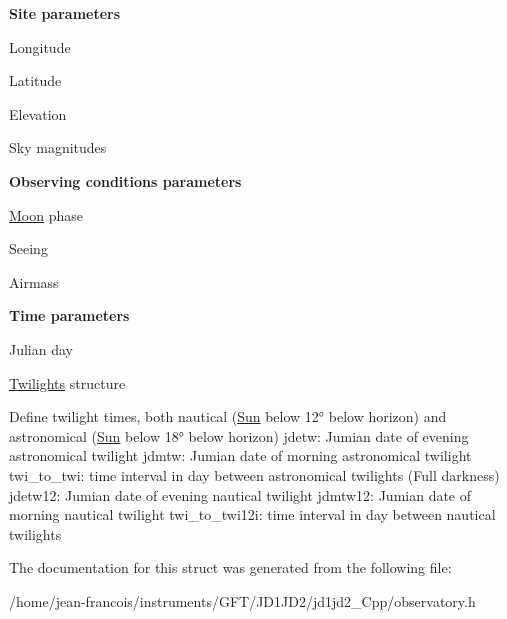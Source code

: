 {\bfseries Site parameters }\par
 Longitude \par
 Latitude \par
 Elevation \par
 Sky magnitudes \par
 {\bfseries  Observing conditions parameters} \par
 \hyperlink{class_moon}{Moon} phase \par
 Seeing \par
 Airmass \par
 {\bfseries Time parameters }\par
 Julian day \par
\hyperlink{struct_twilights}{Twilights} structure

Define twilight times, both nautical (\hyperlink{class_sun}{Sun} below 12° below horizon) and astronomical (\hyperlink{class_sun}{Sun} below 18° below horizon) jdetw\-: Jumian date of evening astronomical twilight jdmtw\-: Jumian date of morning astronomical twilight twi\-\_\-to\-\_\-twi\-: time interval in day between astronomical twilights (Full darkness) jdetw12\-: Jumian date of evening nautical twilight jdmtw12\-: Jumian date of morning nautical twilight twi\-\_\-to\-\_\-twi12i\-: time interval in day between nautical twilights 

The documentation for this struct was generated from the following file\-:\begin{DoxyCompactItemize}
\item 
/home/jean-\/francois/instruments/\-G\-F\-T/\-J\-D1\-J\-D2/jd1jd2\-\_\-\-Cpp/observatory.\-h\end{DoxyCompactItemize}
